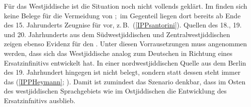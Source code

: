   

 
 



Für das Westjiddische ist die Situation noch nicht vollends geklärt. Im  finden sich keine Belege für die Vermeidung von \hai{{\IPP}};\, im Gegenteil liegen dort bereits ab Ende des 15. Jahrunderts Zeugnise für \hai{{\IPP}} vor, z.\,B.\, (\ref{IPPsantorini}). Quellen des 18., 19. und 20. Jahrhunderts  aus dem Südwestjiddischen und Zentralwestjiddischen zeigen ebenso Evidenz für den . Unter diesen Vorrausetzungen muss angenommen werden, dass sich das Westjiddische analog zum Deutschen in Richtung eines Ersatzinfinitivs entwickelt hat. In einer nordwestjiddischen Quelle aus dem Berlin des 19. Jahrhundert hingegen ist \hai{{\IPP}} nicht belegt, sondern statt dessen steht immer das  (\ref{IPPHeymann}; \citealt[64f]{Schaefer2010}). Damit ist zumindest das Szenario denkbar, dass  im Osten des westjiddischen Sprachgebiets wie im Ostjiddischen die Entwicklung des Ersatzinfnitivs ausblieb.  


